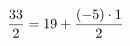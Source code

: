 \documentclass[preview]{standalone}
\begin{document}
\begin{align*}
\special{dvisvgm:raw <g id='unique000'>}\frac{33}{2} = 19 + \frac{(-5) \cdot 1}{2}\special{dvisvgm:raw </g>}
\end{align*}
\end{document}
